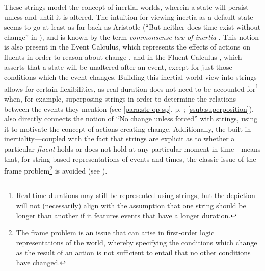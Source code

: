\documentclass[a4paper,12pt,leqno]{article}
\newcommand{\selfnote}[1]{{\color{red}[NB\footnote{{\color{red}#1}}]}}
\newcommand{\nb}{\selfnote}
\begin{document}
These strings model the concept of inertial worlds, wherein a state will persist unless and until it is altered. The intuition for viewing inertia as a default state seems to go at least as far back as Aristotle (``But neither does time exist without change'' in \textit{}), and is known by the term \textit{commonsense law of inertia} \citep[p. 19]{shanahan1997solving}. This notion is also present in the Event Calculus, which represents the effects of actions on fluents in order to reason about change \citep{Kowalski1986,Miller1999,Mueller2008}, and in the Fluent Calculus \citep{thielscher1999situation}, which asserts that a state will be unaltered after an event, except for just those conditions which the event changes.
Building this inertial world view into strings allows for certain flexibilities, as real duration does not need to be accounted for\footnote{Real-time durations may still be represented using strings, but the depiction will not (necessarily) align with the assumption that one string should be longer than another if it features events that have a longer duration.} when, for example, superposing strings in order to determine the relations between the events they mention (see \cref{para:str-op-sp}, p. \pageref{para:str-op-sp}; \cref{ssub:superposition}). \citet[p. 44]{Fernando2018} also directly connects the notion of ``No change unless forced'' with strings, using it to motivate the concept of actions creating change. Additionally, the built-in inertiality---coupled with the fact that strings are explicit as to whether a particular \textit{fluent} holds or does not hold at any particular moment in time---means that, for string-based representations of events and times, the classic issue of the frame problem\footnote{The frame problem is an issue that can arise in first-order logic representations of the world, whereby specifying the conditions which change as the result of an action is not sufficient to entail that no other conditions have changed.} is avoided (see \citet[pp. 30-31]{Mccarthy69somephilosophical}).


\end{document}
